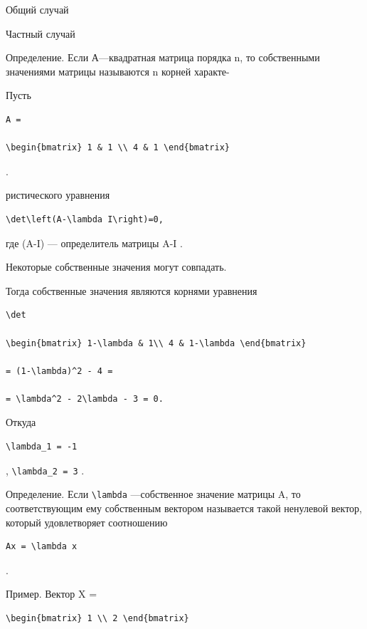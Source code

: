 \documentclass[
  ukrainian,
]{article}
\begin{document}
Общий случай

Частный случай

Определение. Если А---квадратная матрица порядка n, то собственными
значениями матрицы называются n корней характе-

Пусть

\begin{verbatim}
A =

\begin{bmatrix} 1 & 1 \\ 4 & 1 \end{bmatrix}
\end{verbatim}

.

ристического уравнения

\begin{verbatim}
\det\left(A-\lambda I\right)=0,
\end{verbatim}

где \det(A-\lambda I) --- определитель матрицы A-\lambda I .

Некоторые собственные значения могут совпадать.

Тогда собственные значения являются корнями уравнения

\begin{verbatim}
\det

\begin{bmatrix} 1-\lambda & 1\\ 4 & 1-\lambda \end{bmatrix}

= (1-\lambda)^2 - 4 =

= \lambda^2 - 2\lambda - 3 = 0.
\end{verbatim}

Откуда

\begin{verbatim}
\lambda_1 = -1
\end{verbatim}

, \texttt{\textbackslash{}lambda\_2\ =\ 3} .

Определение. Если \texttt{\textbackslash{}lambda} ---собственное
значение матрицы A, то соответствующим ему собственным вектором
называется такой ненулевой вектор, который удовлетворяет соотношению

\begin{verbatim}
Ax = \lambda x
\end{verbatim}

.

Пример. Вектор X =

\begin{verbatim}
\begin{bmatrix} 1 \\ 2 \end{bmatrix}
\end{verbatim}
\end{document}
